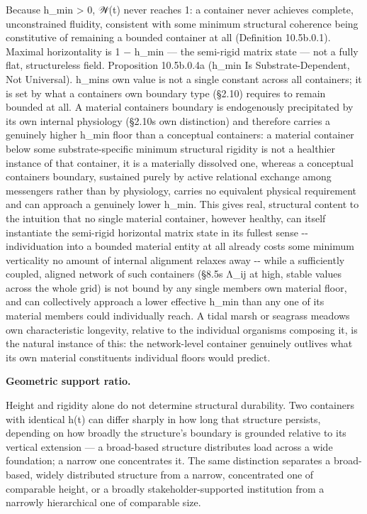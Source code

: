 \documentclass[
]{article}
\begin{document}
Because h\_min \textgreater{} 0, 𝒲(t) never reaches 1: a container never
achieves complete, unconstrained fluidity, consistent with some minimum
structural coherence being constitutive of remaining a bounded container
at all (Definition 10.5b.0.1). Maximal horizontality is 1 − h\_min ---
the semi-rigid matrix state --- not a fully flat, structureless field.
Proposition 10.5b.0.4a (h\_min Is Substrate-Dependent, Not Universal).
h\_min\textquotesingle s own value is not a single constant across all
containers; it is set by what a container\textquotesingle s own boundary
type (§2.10) requires to remain bounded at all. A material
container\textquotesingle s boundary is endogenously precipitated by its
own internal physiology (§2.10\textquotesingle s own distinction) and
therefore carries a genuinely higher h\_min floor than a conceptual
container\textquotesingle s: a material container below some
substrate-specific minimum structural rigidity is not a healthier
instance of that container, it is a materially dissolved one, whereas a
conceptual container\textquotesingle s boundary, sustained purely by
active relational exchange among messengers rather than by physiology,
carries no equivalent physical requirement and can approach a genuinely
lower h\_min. This gives real, structural content to the intuition that
no single material container, however healthy, can itself instantiate
the semi-rigid horizontal matrix state in its fullest sense -\/-
individuation into a bounded material entity at all already costs some
minimum verticality no amount of internal alignment relaxes away -\/-
while a sufficiently coupled, aligned network of such containers
(§8.5\textquotesingle s Λ\_ij at high, stable values across the whole
grid) is not bound by any single member\textquotesingle s own material
floor, and can collectively approach a lower effective h\_min than any
one of its material members could individually reach. A tidal marsh or
seagrass meadow\textquotesingle s own characteristic longevity, relative
to the individual organisms composing it, is the natural instance of
this: the network-level container genuinely outlives what its own
material constituents\textquotesingle{} individual floors would predict.

\textbf{Geometric support ratio.}

Height and rigidity alone do not determine structural durability. Two
containers with identical h(t) can differ sharply in how long that
structure persists, depending on how broadly the structure's boundary is
grounded relative to its vertical extension --- a broad-based structure
distributes load across a wide foundation; a narrow one concentrates it.
The same distinction separates a broad-based, widely distributed
structure from a narrow, concentrated one of comparable height, or a
broadly stakeholder-supported institution from a narrowly hierarchical
one of comparable size.
\end{document}
